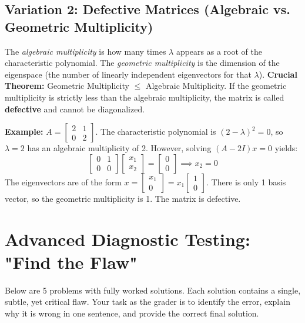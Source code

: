 \documentclass[11pt, a4paper]{article}
\theoremstyle{definition}
\theoremstyle{remark}
\begin{document}
\subsection{Variation 2: Defective Matrices (Algebraic vs. Geometric Multiplicity)}
The \textit{algebraic multiplicity} is how many times $\lambda$ appears as a root of the characteristic polynomial. The \textit{geometric multiplicity} is the dimension of the eigenspace (the number of linearly independent eigenvectors for that $\lambda$). 
\textbf{Crucial Theorem:} Geometric Multiplicity $\leq$ Algebraic Multiplicity.
If the geometric multiplicity is strictly less than the algebraic multiplicity, the matrix is called \textbf{defective} and cannot be diagonalized.

\textbf{Example:} $A = \begin{bmatrix} 2 & 1 \\ 0 & 2 \end{bmatrix}$. 
The characteristic polynomial is $(2 - \lambda)^2 = 0$, so $\lambda = 2$ has an algebraic multiplicity of 2. 
However, solving $(A - 2I)x = 0$ yields:
\[ \begin{bmatrix} 0 & 1 \\ 0 & 0 \end{bmatrix} \begin{bmatrix} x_1 \\ x_2 \end{bmatrix} = \begin{bmatrix} 0 \\ 0 \end{bmatrix} \implies x_2 = 0 \]
The eigenvectors are of the form $x = \begin{bmatrix} x_1 \\ 0 \end{bmatrix} = x_1 \begin{bmatrix} 1 \\ 0 \end{bmatrix}$. There is only 1 basis vector, so the geometric multiplicity is 1. The matrix is defective.

\newpage
\section{Advanced Diagnostic Testing: "Find the Flaw"}

Below are 5 problems with fully worked solutions. Each solution contains a single, subtle, yet critical flaw. Your task as the grader is to identify the error, explain why it is wrong in one sentence, and provide the correct final solution.
\end{document}
